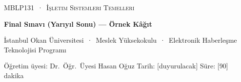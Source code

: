 \setlength{\emergencystretch}{3em}\sloppy
{}
\setlength{\parskip}{0.35em}
\newcommand{\pts}[1]{\hfill\textcolor{mintdeep}{\textbf{[#1~puan]}}}
\newcommand{\ans}[1]{\par\smallskip\noindent\begin{tikzpicture}\draw[muted!60,rounded corners=2pt] (0,0) rectangle (\linewidth,#1);\end{tikzpicture}\par\medskip}
\newcommand{\ganttgrid}[2]{\par\noindent\begin{tikzpicture}[x=0.7cm]
\node[anchor=east,font=\small\bfseries] at (-0.2,0.31) {#2};
\draw[muted!70] (0,0) rectangle (#1,0.62);
\foreach \t in {0,...,#1} {\draw[muted!70] (\t,0) -- (\t,-0.1) node[below,font=\scriptsize,text=muted,inner sep=1pt] {\t};}
\end{tikzpicture}\par\smallskip}
\newcommand{\frametable}[1]{\begin{tabular}{@{}l|*{12}{>{\centering\arraybackslash}p{0.6cm}|}@{}}
\multicolumn{13}{@{}l}{\textbf{#1}}\\ \hline
başv. & 5 & 4 & 1 & 5 & 0 & 5 & 4 & 0 & 2 & 1 & 0 & 1 \\ \hline
çr.\ 0 &&&&&&&&&&&& \\ \hline
çr.\ 1 &&&&&&&&&&&& \\ \hline
çr.\ 2 &&&&&&&&&&&& \\ \hline
hata &&&&&&&&&&&& \\ \hline
\end{tabular}}

\thispagestyle{empty}
\begin{tcolorbox}[enhanced,colback=dark,colframe=dark,arc=0pt,boxrule=0pt,
  left=18pt,right=18pt,top=14pt,bottom=14pt,coltext=white]
{\small\color{mint}\textsc{MBLP131 \,·\, İşletim Sistemleri Temelleri}}\par\smallskip
{\headfont\fontsize{22}{26}\selectfont\bfseries Final Sınavı (Yarıyıl Sonu) --- Örnek Kâğıt}\par\smallskip
{\small İstanbul Okan Üniversitesi \,·\, Meslek Yüksekokulu \,·\, Elektronik Haberleşme Teknolojisi Programı}\par
{\small Öğretim üyesi: Dr.\ Öğr.\ Üyesi Hasan Oğuz \quad Tarih: [duyurulacak] \quad Süre: [90] dakika}
\end{tcolorbox}

